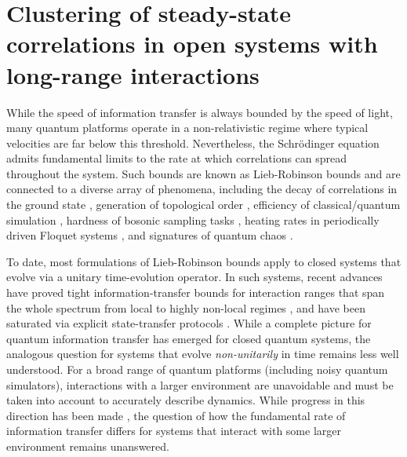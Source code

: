 \section{Clustering of steady-state correlations in open systems with long-range interactions}

While the speed of information transfer is always bounded by the speed of light, many quantum platforms operate in a non-relativistic regime where typical velocities are far below this threshold.
Nevertheless, the  Schr\"odinger equation admits fundamental limits to the rate  at which correlations  can spread throughout the system.
Such bounds are known as Lieb-Robinson bounds and are connected to a diverse array of phenomena, including the decay of correlations in the ground state \cite{Hastings2006}, generation of topological order \cite{Bravyi2006, Bravyi2010}, efficiency of classical/quantum simulation \cite{Osborne2006,Tran2019a}, hardness of bosonic sampling tasks \cite{Deshpande2018}, heating rates in periodically driven Floquet systems \cite{Abanin2015,Tran2019b}, and signatures of quantum chaos \cite{Lashkari2013,Guo2019}.

To date, most  formulations of Lieb-Robinson bounds apply to closed systems that evolve  via a unitary time-evolution operator.
In such systems, recent advances have proved tight information-transfer bounds for interaction ranges that span the whole spectrum from local \cite{ChenLucas2021graphtheory,WangHazzard2020} to highly non-local regimes \cite{Tran2019a,Chen2019,kuwaharaStrictlyLinearLight2020,Tran2021b}, and have been saturated via explicit state-transfer protocols \cite{Eldredge2017,Tran2020hierarchylinearlightcones,Tran2021}.
While a complete picture for quantum information transfer has emerged for closed quantum systems,  the analogous question for systems that evolve \textit{non-unitarily} in time remains less well understood.
For a broad range of quantum platforms (including noisy quantum simulators), interactions with a  larger environment are unavoidable and must be taken into account to accurately describe dynamics.
While progress in this direction has been made \cite{poulin2010, descamps2013, cubitt2015, Kastoryano2013, Sweke2019}, the question of how the fundamental rate of information transfer differs for systems that interact with some larger environment remains unanswered.


